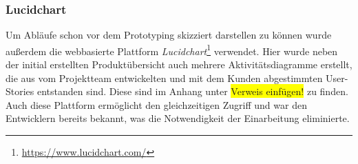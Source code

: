 \documentclass[10pt, a4paper]{article}
\begin{document}
\begin{onehalfspace}
      \subsubsection{Lucidchart}
      \label{Lucidchart}
      Um Abläufe schon vor dem Prototyping skizziert darstellen zu können wurde außerdem die webbasierte Plattform \textit{Lucidchart}\footnote{\raggedright\url{https://www.lucidchart.com/}} verwendet.
      Hier wurde neben der initial erstellten Produktübersicht auch mehrere Aktivitätsdiagramme erstellt, die aus vom Projektteam entwickelten und mit dem Kunden abgestimmten User-Stories entstanden sind.
      Diese sind im Anhang unter \colorbox{yellow}{Verweis einfügen!} zu finden.
      Auch diese Plattform ermöglicht den gleichzeitigen Zugriff und war den Entwicklern bereits bekannt, was die Notwendigkeit der Einarbeitung eliminierte.

\end{onehalfspace}
\end{document}
